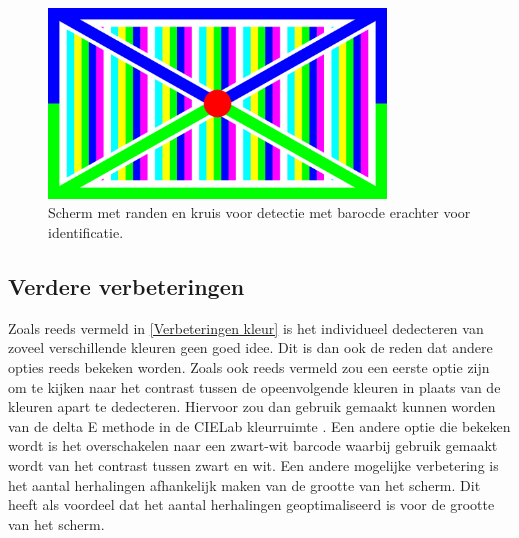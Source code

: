 \begin{figure}[h!]
	\center
	\includegraphics[width=0.8\textwidth]{img/screen.png}
	\caption{Scherm met randen en kruis voor detectie met barocde erachter voor identificatie.}
	\label{html}
	\label{scherm}
\end{figure}

\subsection{Verdere verbeteringen}
Zoals reeds vermeld in \ref{Verbeteringen kleur} is het individueel dedecteren van zoveel verschillende kleuren geen goed idee. Dit is dan ook de reden dat andere opties reeds bekeken worden. Zoals ook reeds vermeld zou een eerste optie zijn om te kijken naar het contrast tussen de opeenvolgende kleuren in plaats van de kleuren apart te dedecteren. Hiervoor zou dan gebruik gemaakt kunnen worden van de delta E methode in de CIELab kleurruimte \cite{article}. Een andere optie die bekeken wordt is het overschakelen naar een zwart-wit barcode waarbij gebruik gemaakt wordt van het contrast tussen zwart en wit. Een andere mogelijke verbetering is het aantal herhalingen afhankelijk maken van de grootte van het scherm. Dit heeft als voordeel dat het aantal herhalingen geoptimaliseerd is voor de grootte van het scherm.
